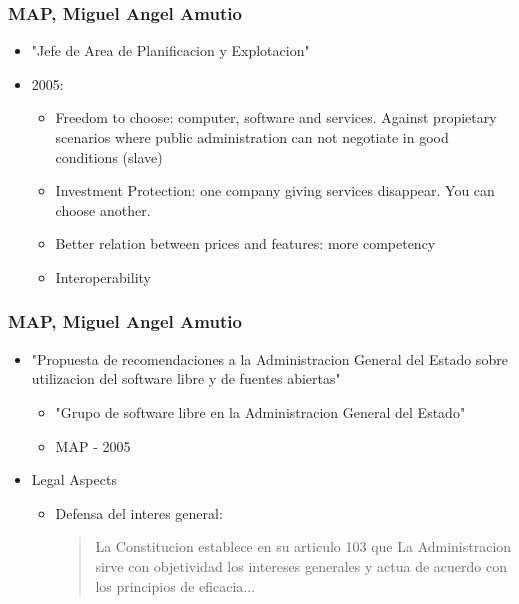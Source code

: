 \documentclass{beamer}
\begin{document}
\begin{frame}
\frametitle{ MAP, Miguel Angel Amutio}

\begin{itemize}
\item "Jefe de Area de Planificacion y Explotacion"
\item 2005:
\begin {itemize}
	\item Freedom to choose: computer, software and services. Against propietary scenarios where public administration can not negotiate in good conditions (slave)
	\item Investment Protection: one company giving services disappear. You can choose another. 
	\item Better relation between prices and features: more competency
	\item Interoperability
\end {itemize}
\end{itemize}

\end{frame}

\begin{frame}
\frametitle{ MAP, Miguel Angel Amutio}

\begin{itemize}
\item "Propuesta de recomendaciones a la Administracion General del Estado sobre utilizacion del software libre y de fuentes abiertas"
\begin {itemize}
	\item "Grupo de software libre en la Administracion General del Estado"
	\item  MAP - 2005
\end {itemize}
\item Legal Aspects
\begin {itemize}
	\item Defensa del interes general:
	\begin{quote} 
	La Constitucion establece en su articulo 103 que La Administracion sirve con objetividad los intereses generales y actua de acuerdo con los principios de eficacia...
	\end{quote}
\end {itemize}
\end{itemize}

\end{frame}
\end{document}
